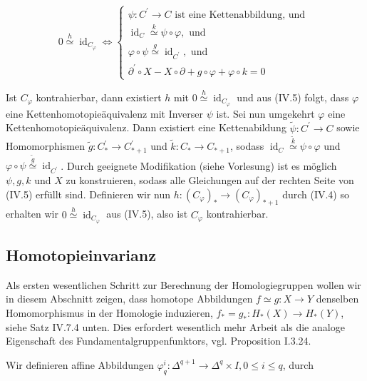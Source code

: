 \documentclass[10pt, letterpaper]{article}
\begin{document}
$$
0 \stackrel{h}{\simeq} \operatorname{id}_{C_{\varphi}} \Longleftrightarrow\left\{\begin{array}{l}
\psi: C^{\prime} \rightarrow C \text { ist eine Kettenabbildung, und } \\
\operatorname{id}_C \stackrel{k}{\simeq} \psi \circ \varphi, \text { und } \\
\varphi \circ \psi \stackrel{g}{\simeq} \operatorname{id}_{C^{\prime}}, \text { und } \\
\partial^{\prime} \circ X-X \circ \partial+g \circ \varphi+\varphi \circ k=0
\end{array}\right.
$$


Ist $C_{\varphi}$ kontrahierbar, dann existiert $h$ mit $0 \stackrel{h}{\simeq} \operatorname{id}_{C_{\varphi}}$ und aus (IV.5) folgt, dass $\varphi$ eine Kettenhomotopieäquivalenz mit Inverser $\psi$ ist. Sei nun umgekehrt $\varphi$ eine Kettenhomotopieäquivalenz. Dann existiert eine Kettenabildung $\tilde{\psi}: C^{\prime} \rightarrow C$ sowie Homomorphismen $\tilde{g}: C_*^{\prime} \rightarrow C_{*+1}^{\prime}$ und $\tilde{k}: C_* \rightarrow C_{*+1}$, sodass $\operatorname{id}_C \stackrel{\tilde{k}}{\simeq} \psi \circ \varphi$ und $\varphi \circ \psi \stackrel{\tilde{g}}{\simeq} \operatorname{id}_{C^{\prime}}$. Durch geeignete Modifikation (siehe Vorlesung) ist es möglich $\psi, g, k$ und $X$ zu konstruieren, sodass alle Gleichungen auf der rechten Seite von (IV.5) erfüllt sind. Definieren wir nun $h:\left(C_{\varphi}\right)_* \rightarrow\left(C_{\varphi}\right)_{*+1}$ durch (IV.4) so erhalten wir $0 \stackrel{h}{\simeq} \operatorname{id}_{C_{\varphi}}$ aus (IV.5), also ist $C_{\varphi}$ kontrahierbar.


\pagebreak


\subsection{Homotopieinvarianz}

Als ersten wesentlichen Schritt zur Berechnung der Homologiegruppen wollen wir in diesem Abschnitt zeigen, dass homotope Abbildungen $f \simeq g: X \rightarrow Y$ denselben Homomorphismus in der Homologie induzieren, $f_*=g_*: H_*(X) \rightarrow H_*(Y)$, siehe Satz IV.7.4 unten. Dies erfordert wesentlich mehr Arbeit als die analoge Eigenschaft des Fundamentalgruppenfunktors, vgl. Proposition I.3.24.

Wir definieren affine Abbildungen $\varphi_q^i: \Delta^{q+1} \rightarrow \Delta^q \times I, 0 \leq i \leq q$, durch
\end{document}
